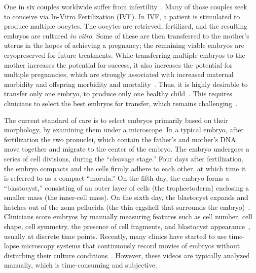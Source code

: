 
One in six couples worldwide suffer from infertility~\cite{cui2010mother}. Many of those couples seek to conceive via In-Vitro Fertilization (IVF). In IVF, a patient is stimulated to produce multiple oocytes. The oocytes are retrieved, fertilized, and the resulting embryos are cultured \textit{in vitro}. Some of these are then transferred to the mother's uterus in the hopes of achieving a pregnancy; the remaining viable embryos are cryopreserved for future treatments. While transferring multiple embryos to the mother increases the potential for success, it also increases the potential for multiple pregnancies, which are strongly associated with increased maternal morbidity and offspring morbidity and mortality~\cite{norwitz2005maternal}. Thus, it is highly desirable to transfer only one embryo, to produce only one healthy child~\cite{practice2017guidance}. This requires clinicians to select the best embryos for transfer, which remains challenging~\cite{racowsky2011national}. %

The current standard of care is to select embryos primarily based on their morphology, by examining them under a microscope. In a typical embryo, after fertilization the two pronuclei, which contain the father's and mother's DNA, move together and migrate to the center of the embryo. The embryo undergoes a series of cell divisions, during the ``cleavage stage.'' Four days after fertilization, the embryo compacts and the cells firmly adhere to each other, at which time it is referred to as a compact ``morula.'' On the fifth day, the embryo forms a ``blastocyst,'' consisting of an outer layer of cells (the trophectoderm) enclosing a smaller mass (the inner-cell mass). On the sixth day, the blastocyst expands and hatches out of the zona pellucida (the thin eggshell that surrounds the embryo)~\cite{elder2020vitro}. Clinicians score embryos by manually measuring features such as cell number, cell shape, cell symmetry, the presence of cell fragments, and blastocyst appearance~\cite{elder2020vitro}, usually at discrete time points. Recently, many clinics have started to use time-lapse microscopy systems that continuously record movies of embryos without disturbing their culture conditions~\cite{rubio2014clinical,dolinko2017national,armstrong2019time}. However, these videos are typically analyzed manually, which is time-consuming and subjective.

